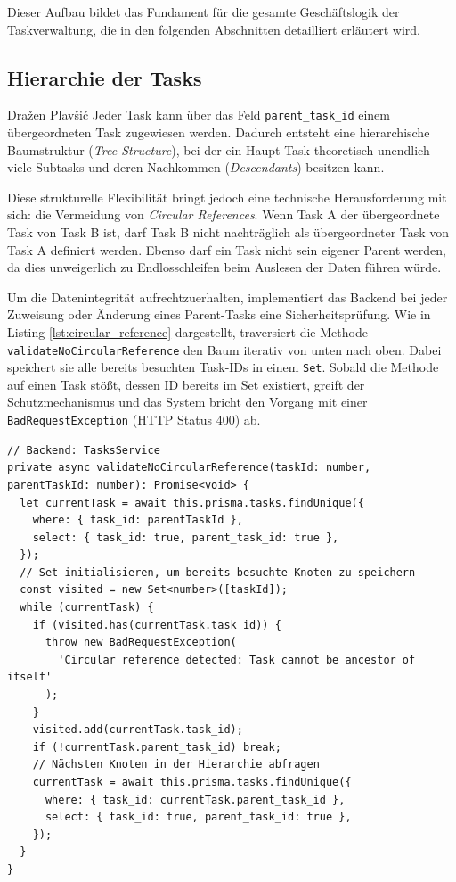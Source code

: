 Dieser Aufbau bildet das Fundament für die gesamte Geschäftslogik der Taskverwaltung, die in den folgenden Abschnitten detailliert erläutert wird.

\subsection{Hierarchie der Tasks}{Dražen Plavšić}
Jeder Task kann über das Feld \texttt{parent\_task\_id} einem übergeordneten Task zugewiesen werden. Dadurch entsteht eine hierarchische Baumstruktur (\textit{Tree Structure})\cite{celko2004trees}, bei der ein Haupt-Task theoretisch unendlich viele Subtasks und deren Nachkommen (\textit{Descendants}) besitzen kann.

Diese strukturelle Flexibilität bringt jedoch eine technische Herausforderung mit sich: die Vermeidung von \textit{Circular References}. Wenn Task A der übergeordnete Task von Task B ist, darf Task B nicht nachträglich als übergeordneter Task von Task A definiert werden. Ebenso darf ein Task nicht sein eigener Parent werden, da dies unweigerlich zu Endlosschleifen beim Auslesen der Daten führen würde.

Um die Datenintegrität aufrechtzuerhalten, implementiert das Backend bei jeder Zuweisung oder Änderung eines Parent-Tasks eine Sicherheitsprüfung. Wie in Listing \ref{lst:circular_reference} dargestellt, traversiert die Methode \texttt{validateNoCircularReference} den Baum iterativ von unten nach oben. Dabei speichert sie alle bereits besuchten Task-IDs in einem \texttt{Set}. Sobald die Methode auf einen Task stößt, dessen ID bereits im Set existiert, greift der Schutzmechanismus und das System bricht den Vorgang mit einer \texttt{BadRequestException} (HTTP Status 400) ab.

\begin{listing}[H]
\begin{verbatim}
// Backend: TasksService
private async validateNoCircularReference(taskId: number, parentTaskId: number): Promise<void> {
  let currentTask = await this.prisma.tasks.findUnique({
    where: { task_id: parentTaskId },
    select: { task_id: true, parent_task_id: true },
  });
  // Set initialisieren, um bereits besuchte Knoten zu speichern
  const visited = new Set<number>([taskId]);
  while (currentTask) {
    if (visited.has(currentTask.task_id)) {
      throw new BadRequestException(
        'Circular reference detected: Task cannot be ancestor of itself'
      );
    }
    visited.add(currentTask.task_id);
    if (!currentTask.parent_task_id) break;
    // Nächsten Knoten in der Hierarchie abfragen
    currentTask = await this.prisma.tasks.findUnique({
      where: { task_id: currentTask.parent_task_id },
      select: { task_id: true, parent_task_id: true },
    });
  }
}
\end{verbatim}
\caption{Schutz vor Zirkelbezügen durch Traversierung der Baumstruktur}
\label{lst:circular_reference}
\end{listing}

